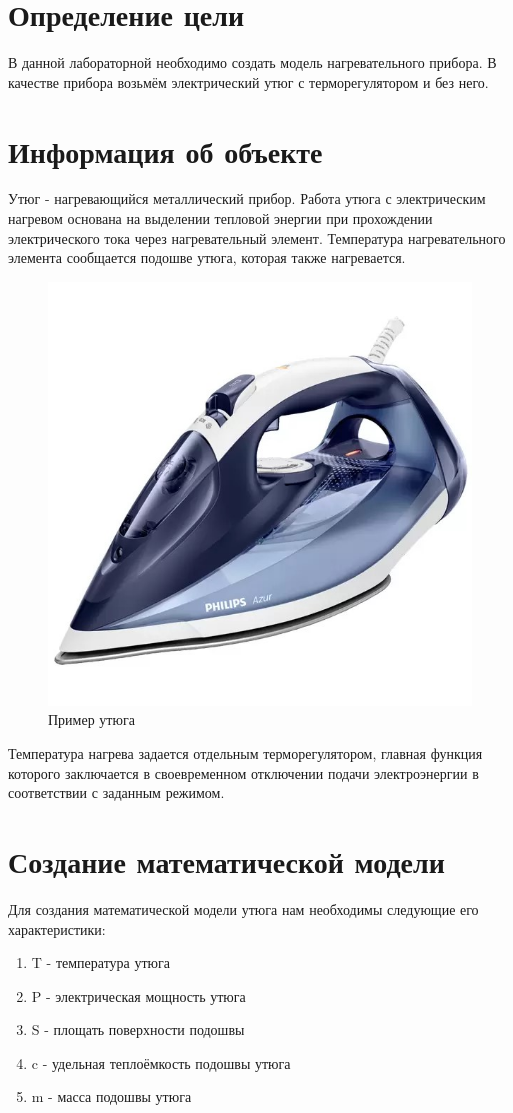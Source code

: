 \documentclass[a4paper, 14pt]{extarticle}
\begin{document}
	\pagebreak	

	\section{Определение цели}
		В данной лабораторной необходимо создать модель нагревательного прибора. В качестве прибора возьмём электрический утюг с терморегулятором и без него.

	\section{Информация об объекте}
		Утюг - нагревающийся металлический прибор. Работа утюга с электрическим нагревом основана на выделении тепловой энергии при прохождении электрического тока через нагревательный элемент. Температура нагревательного элемента сообщается подошве утюга, которая также нагревается.
		
		\begin{figure}[H]
			\centering
			\includegraphics[width = .5\linewidth]{utug.jpg}
			\caption[.] {Пример утюга}
		\end{figure}
		
		Температура нагрева задается отдельным терморегулятором, главная функция которого заключается в своевременном отключении подачи электроэнергии в соответствии с заданным режимом.
		

	\section{Создание математической модели}
		Для создания математической модели утюга нам необходимы следующие его характеристики:
		\begin{enumerate}[leftmargin=3\parindent, itemsep=0mm]
			\item T - температура утюга
			\item P - электрическая мощность утюга
			\item S - площать поверхности подошвы
			\item c - удельная теплоёмкость подошвы утюга
			\item m - масса подошвы утюга
		\end{enumerate}
	
\end{document}
